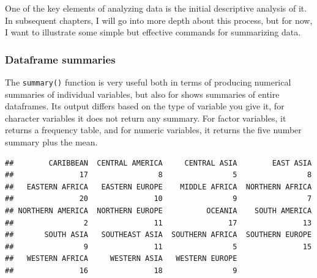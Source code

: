 \documentclass[
]{article}
\newenvironment{Shaded}{\begin{snugshade}}{\end{snugshade}}
\newcommand{\FunctionTok}[1]{\textcolor[rgb]{0.00,0.00,0.00}{#1}}
\newcommand{\NormalTok}[1]{#1}
\newcommand{\SpecialCharTok}[1]{\textcolor[rgb]{0.00,0.00,0.00}{#1}}
\begin{document}
One of the key elements of analyzing data is the initial descriptive
analysis of it. In subsequent chapters, I will go into more depth about
this process, but for now, I want to illustrate some simple but
effective commands for summarizing data.

\hypertarget{dataframe-summaries}{%
\subsubsection{Dataframe summaries}\label{dataframe-summaries}}

The \texttt{summary()} function is very useful both in terms of producing
numerical summaries of individual variables, but also for shows
summaries of entire dataframes. Its output differs based on the type of
variable you give it, for character variables it does not return any
summary. For factor variables, it returns a frequency table, and for
numeric variables, it returns the five number summary plus the mean.

\begin{Shaded}
\end{Shaded}

\begin{verbatim}
##        CARIBBEAN  CENTRAL AMERICA     CENTRAL ASIA        EAST ASIA 
##               17                8                5                8 
##   EASTERN AFRICA   EASTERN EUROPE    MIDDLE AFRICA  NORTHERN AFRICA 
##               20               10                9                7 
## NORTHERN AMERICA  NORTHERN EUROPE          OCEANIA    SOUTH AMERICA 
##                2               11               17               13 
##       SOUTH ASIA   SOUTHEAST ASIA  SOUTHERN AFRICA  SOUTHERN EUROPE 
##                9               11                5               15 
##   WESTERN AFRICA     WESTERN ASIA   WESTERN EUROPE 
##               16               18                9
\end{verbatim}

\begin{Shaded}
\end{Shaded}
\end{document}
